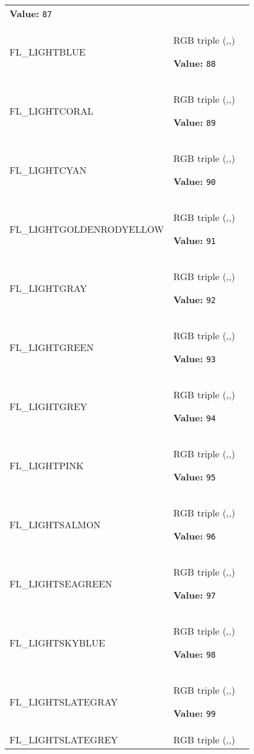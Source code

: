 \begin{longtable}{|p{\varnamewidth}|p{\vardescrwidth}|l}
\textbf{Value:} 
{\tt 87}&\\
\cline{1-2}
\raggedright F\-L\-\_\-L\-I\-G\-H\-T\-B\-L\-U\-E\- & \raggedright RGB triple (,,)

\textbf{Value:} 
{\tt 88}&\\
\cline{1-2}
\raggedright F\-L\-\_\-L\-I\-G\-H\-T\-C\-O\-R\-A\-L\- & \raggedright RGB triple (,,)

\textbf{Value:} 
{\tt 89}&\\
\cline{1-2}
\raggedright F\-L\-\_\-L\-I\-G\-H\-T\-C\-Y\-A\-N\- & \raggedright RGB triple (,,)

\textbf{Value:} 
{\tt 90}&\\
\cline{1-2}
\raggedright F\-L\-\_\-L\-I\-G\-H\-T\-G\-O\-L\-D\-E\-N\-R\-O\-D\-Y\-E\-L\-L\-O\-W\- & \raggedright RGB triple (,,)

\textbf{Value:} 
{\tt 91}&\\
\cline{1-2}
\raggedright F\-L\-\_\-L\-I\-G\-H\-T\-G\-R\-A\-Y\- & \raggedright RGB triple (,,)

\textbf{Value:} 
{\tt 92}&\\
\cline{1-2}
\raggedright F\-L\-\_\-L\-I\-G\-H\-T\-G\-R\-E\-E\-N\- & \raggedright RGB triple (,,)

\textbf{Value:} 
{\tt 93}&\\
\cline{1-2}
\raggedright F\-L\-\_\-L\-I\-G\-H\-T\-G\-R\-E\-Y\- & \raggedright RGB triple (,,)

\textbf{Value:} 
{\tt 94}&\\
\cline{1-2}
\raggedright F\-L\-\_\-L\-I\-G\-H\-T\-P\-I\-N\-K\- & \raggedright RGB triple (,,)

\textbf{Value:} 
{\tt 95}&\\
\cline{1-2}
\raggedright F\-L\-\_\-L\-I\-G\-H\-T\-S\-A\-L\-M\-O\-N\- & \raggedright RGB triple (,,)

\textbf{Value:} 
{\tt 96}&\\
\cline{1-2}
\raggedright F\-L\-\_\-L\-I\-G\-H\-T\-S\-E\-A\-G\-R\-E\-E\-N\- & \raggedright RGB triple (,,)

\textbf{Value:} 
{\tt 97}&\\
\cline{1-2}
\raggedright F\-L\-\_\-L\-I\-G\-H\-T\-S\-K\-Y\-B\-L\-U\-E\- & \raggedright RGB triple (,,)

\textbf{Value:} 
{\tt 98}&\\
\cline{1-2}
\raggedright F\-L\-\_\-L\-I\-G\-H\-T\-S\-L\-A\-T\-E\-G\-R\-A\-Y\- & \raggedright RGB triple (,,)

\textbf{Value:} 
{\tt 99}&\\
\cline{1-2}
\raggedright F\-L\-\_\-L\-I\-G\-H\-T\-S\-L\-A\-T\-E\-G\-R\-E\-Y\- & \raggedright RGB triple (,,)


\end{longtable}

